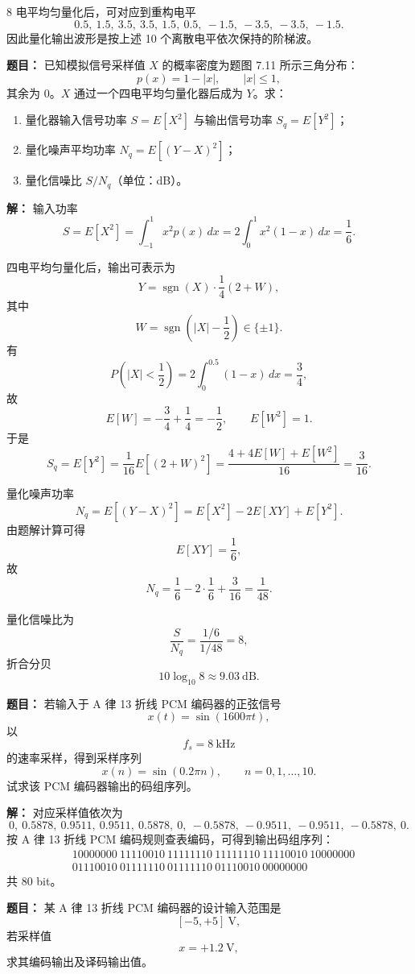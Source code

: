 8 电平均匀量化后，可对应到重构电平
\[
0.5,\ 1.5,\ 3.5,\ 3.5,\ 1.5,\ 0.5,\ -1.5,\ -3.5,\ -3.5,\ -1.5.
\]
因此量化输出波形是按上述 10 个离散电平依次保持的阶梯波。

\medskip
{}
\textbf{题目：}
已知模拟信号采样值 $X$ 的概率密度为题图 7.11 所示三角分布：
\[
p(x)=1-|x|,\qquad |x|\le 1,
\]
其余为 0。$X$ 通过一个四电平均匀量化器后成为 $Y$。求：
\begin{enumerate}
\item 量化器输入信号功率 $S=E[X^2]$ 与输出信号功率 $S_q=E[Y^2]$；
\item 量化噪声平均功率 $N_q=E[(Y-X)^2]$；
\item 量化信噪比 $S/N_q$（单位：dB）。
\end{enumerate}

\par\textbf{解：}
输入功率
\[
S=E[X^2]=\int_{-1}^{1}x^2p(x)\,dx
=2\int_0^1 x^2(1-x)\,dx
=\frac16.
\]

四电平均匀量化后，输出可表示为
\[
Y=\operatorname{sgn}(X)\cdot \frac14(2+W),
\]
其中
\[
W=\operatorname{sgn}\!\left(|X|-\frac12\right)\in\{\pm1\}.
\]
有
\[
P\!\left(|X|<\frac12\right)=2\int_0^{0.5}(1-x)\,dx=\frac34,
\]
故
\[
E[W]=-\frac34+\frac14=-\frac12,\qquad E[W^2]=1.
\]
于是
\[
S_q=E[Y^2]=\frac1{16}E[(2+W)^2]
=\frac{4+4E[W]+E[W^2]}{16}
=\frac{3}{16}.
\]

量化噪声功率
\[
N_q=E[(Y-X)^2]=E[X^2]-2E[XY]+E[Y^2].
\]
由题解计算可得
\[
E[XY]=\frac16,
\]
故
\[
N_q=\frac16-2\cdot \frac16+\frac{3}{16}=\frac1{48}.
\]

量化信噪比为
\[
\frac{S}{N_q}=\frac{1/6}{1/48}=8,
\]
折合分贝
\[
10\log_{10}8\approx 9.03\ \text{dB}.
\]

\medskip
{}
\textbf{题目：}
若输入于 A 律 13 折线 PCM 编码器的正弦信号
\[
x(t)=\sin(1600\pi t),
\]
以
\[
f_s=8\ \text{kHz}
\]
的速率采样，得到采样序列
\[
x(n)=\sin(0.2\pi n),\qquad n=0,1,\dots,10.
\]
试求该 PCM 编码器输出的码组序列。

\par\textbf{解：}
对应采样值依次为
\[
0,\ 0.5878,\ 0.9511,\ 0.9511,\ 0.5878,\ 0,\ -0.5878,\ -0.9511,\ -0.9511,\ -0.5878,\ 0.
\]
按 A 律 13 折线 PCM 编码规则查表编码，可得到输出码组序列：
\[
\begin{aligned}
&10000000\ 11110010\ 11111110\ 11111110\ 11110010\ 10000000\\
&01110010\ 01111110\ 01111110\ 01110010\ 00000000
\end{aligned}
\]
共 80 bit。

\medskip
{}
\textbf{题目：}
某 A 律 13 折线 PCM 编码器的设计输入范围是
\[
[-5,+5]\ \text{V},
\]
若采样值
\[
x=+1.2\ \text{V},
\]
求其编码输出及译码输出值。

